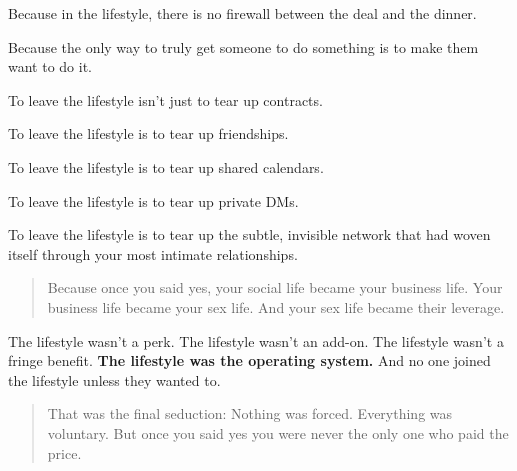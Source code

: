 Because in the lifestyle, there is no firewall between the deal and the dinner.

Because the only way to truly get someone to do something is to make them want to do it.

To leave the lifestyle isn’t just to tear up contracts.

To leave the lifestyle is to tear up friendships.  

To leave the lifestyle is to tear up shared calendars.  

To leave the lifestyle is to tear up private DMs.  

To leave the lifestyle is to tear up the subtle, invisible network that had woven itself through your 
most intimate relationships.

\begin{quote}
Because once you said yes,  
your social life became your business life.  
Your business life became your sex life.  
And your sex life became their leverage.
\end{quote}

The lifestyle wasn’t a perk.
The lifestyle wasn’t an add-on.
The lifestyle wasn’t a fringe benefit.
\textbf{The lifestyle was the operating system.}
And no one joined the lifestyle unless they wanted to.

\begin{quote}
That was the final seduction:  
Nothing was forced.  
Everything was voluntary.  
But once you said yes  
you were never the only one who paid the price.
\end{quote}


